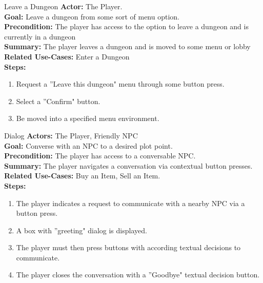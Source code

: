\documentclass[12pt]{report}
\begin{document}
\begin{subsection}{Leave a Dungeon}
\textbf{Actor:} The Player. \\
\textbf{Goal:} Leave a dungeon from some sort of menu option. \\
\textbf{Precondition:} The player has access to the option to leave a dungeon and is currently in a dungeon \\
\textbf{Summary:} The player leaves a dungeon and is moved to some menu or lobby \\
\textbf{Related Use-Cases:} Enter a Dungeon \\
\textbf{Steps:}
\begin{enumerate}
	\item Request a ''Leave this dungeon" menu through some button press.
	\item Select a ''Confirm" button.
	\item Be moved into a specified menu environment.
\end{enumerate}
\end{subsection}

\begin{subsection}{Dialog}
\textbf{Actors:} The Player, Friendly NPC \\
\textbf{Goal:} Converse with an NPC to a desired plot point. \\
\textbf{Precondition:} The player has access to a conversable NPC. \\
\textbf{Summary:} The player navigates a conversation via contextual button presses. \\
\textbf{Related Use-Cases:} Buy an Item, Sell an Item. \\
\textbf{Steps:}
\begin{enumerate}
	\item The player indicates a request to communicate with a nearby NPC via a button press.
	\item A box with ''greeting" dialog is displayed.
	\item The player must then press buttons with according textual decisions to communicate.
	\item The player closes the conversation with a ''Goodbye" textual decision button.
\end{enumerate}
\end{subsection}
\end{document}
